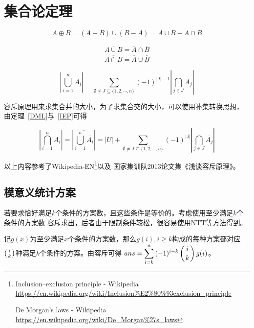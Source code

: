 \section{集合论定理}
\begin{theorem}[对称差]
	\begin{displaymath}
		A\oplus B=(A-B)\cup(B-A)=A\cup B - A\cap B
	\end{displaymath}
\end{theorem}
\begin{theorem}\label{DML}
	\begin{eqnarray*}
		\overline{A\cup B}=\overline{A}\cap \overline{B} \\
		\overline{A\cap B}=\overline{A}\cup \overline{B}
	\end{eqnarray*}
\end{theorem}
\begin{theorem}\label{IEP}
	\begin{displaymath}
		\left|\bigcup_{i=1}^n{A_i}\right|=
		\sum_{\emptyset \neq J\subseteq \{1,2,\cdots,n\}}{(-1)^{|J|-1}
			\left|\bigcap_{j\in J}{A_j}\right|}
	\end{displaymath}
\end{theorem}

容斥原理用来求集合并的大小，为了求集合交的大小，可以使用补集转换思想，
由定理~\ref{DML}与~\ref{IEP}可得

\begin{theorem}\label{ExDML}
	\begin{displaymath}
		\left|\bigcap_{i=1}^n{A_i}\right|=
		\left|\overline{\bigcup_{i=1}^n{\overline{A_i}}}\right|=
		|U|+\sum_{\emptyset \neq J\subseteq \{1,2,\cdots,n\}}{(-1)^{|J|}
			\left|\bigcap_{j\in J}{\overline{A_j}}\right|}
	\end{displaymath}
\end{theorem}

以上内容参考了Wikipedia-EN\footnote{Inclusion–exclusion principle - Wikipedia\\
	\url{https://en.wikipedia.org/wiki/Inclusion\%E2\%80\%93exclusion\_principle}

	De Morgan's laws - Wikipedia
	\url{https://en.wikipedia.org/wiki/De\_Morgan\%27s\_laws}}以及
国家集训队2013论文集《浅谈容斥原理》。
\subsection{模意义统计方案}
若要求恰好满足$k$个条件的方案数，且这些条件是等价的。考虑使用至少满足$k$个条件的方案数
容斥求出，后者由于限制条件较松，很容易使用NTT等方法得到。

记$g(x)$为至少满足$x$个条件的方案数，那么$g(i),i\geq k$构成的每种方案都对应
$\left(i \atop k\right)$种满足$k$个条件的方案。由容斥可得
$ans=\displaystyle \sum_{i=k}^n{(-1)^{i-k}\left(i \atop k\right)g(i)}$。
